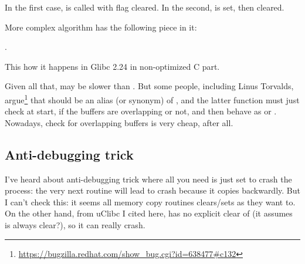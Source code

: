 In the first case,  is called with  flag cleared.
In the second,  is set, then cleared.

More complex algorithm has the following piece in it:

.

This how it happens in Glibc 2.24 in non-optimized C part.

Given all that,  may be slower than .
But some people, including Linus Torvalds, argue\footnote{\url{https://bugzilla.redhat.com/show_bug.cgi?id=638477\#c132}}
that  should be an alias (or synonym) of , and the latter
function must just check at start, if the buffers are overlapping or not, and then behave as  or .
Nowadays, check for overlapping buffers is very cheap, after all.

\subsection{Anti-debugging trick}

I've heard about anti-debugging trick where all you need is just set  to crash the process: the very next 
routine will lead to crash because it copies backwardly.
But I can't check this: it seems all memory copy routines clears/sets  as they want to.
On the other hand,  from uClibc I cited here,
has no explicit clear of  (it assumes  is always clear?),
so it can really crash.


